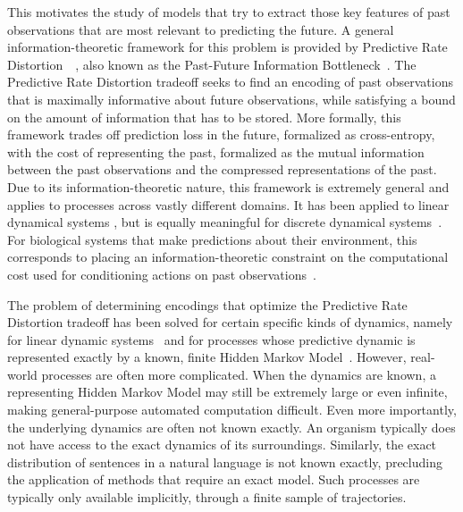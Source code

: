 \documentclass[entropy,article,submit,moreauthors,pdftex,10pt,a4paper]{Definitions/mdpi}
\begin{document}
This motivates the study of models that try to extract those key features of past observations that are most relevant to predicting the future.
A general information-theoretic framework for this problem is provided by Predictive Rate Distortion~~\citep{marzen-predictive-2016}, also known as the Past-Future Information Bottleneck~\citep{creutzig-past-future-2009}.
The Predictive Rate Distortion tradeoff seeks to find an encoding of past observations that is maximally informative about future observations, while satisfying a bound on the amount of information that has to be stored.
More formally, this framework trades off prediction loss in the future, formalized as cross-entropy, with the cost of representing the past, formalized as the mutual information between the past observations and the compressed representations of the past.
Due to its information-theoretic nature, this framework is extremely general and applies to processes across vastly different domains.
It has been applied to linear dynamical systems \citep{creutzig-past-future-2009,amir2015past}, but is equally meaningful for discrete dynamical systems~\citep{marzen-predictive-2016}.
For biological systems that make predictions about their environment, this corresponds to placing an information-theoretic constraint on the computational cost used for conditioning actions on past observations~\citep{genewein2015bounded}.

The problem of determining encodings that optimize the Predictive Rate Distortion tradeoff has been solved for certain specific kinds of dynamics, namely for linear dynamic systems~\citep{creutzig-past-future-2009} and for processes whose predictive dynamic is represented exactly by a known, finite Hidden Markov Model~\citep{marzen-predictive-2016}.
However, real-world processes are often more complicated.
When the dynamics are known, a representing Hidden Markov Model may still be extremely large or even infinite, making general-purpose automated computation difficult.
Even more importantly, the underlying dynamics are often not known exactly.
An organism typically does not have access to the exact dynamics of its surroundings.
Similarly, the exact distribution of sentences in a natural language is not known exactly, precluding the application of methods that require an exact model.
Such processes are typically only available implicitly, through a finite sample of trajectories.
\end{document}
